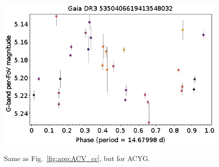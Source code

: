 \documentclass[longauth]{aa}
\begin{document}
\begin{appendix}
\begin{figure}
\hspace{2mm}
 \includegraphics[width=0.45\hsize]{figures/appendix/ACYG-26.png} \\
\vspace{4mm}
 \caption{Same as Fig.~\ref{fig:app:ACV_cc}, but for ACYG.}
 \label{fig:app:ACYG_cc}
\end{figure}




\end{appendix}
\end{document}
